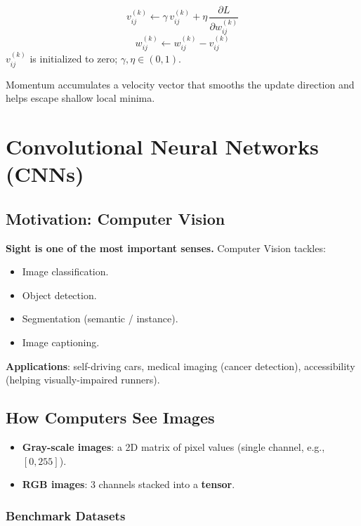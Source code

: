 \documentclass[11pt,a4paper]{article}
\begin{document}
\begin{keybox}
\[
v_{ij}^{(k)} \leftarrow \gamma\, v_{ij}^{(k)} + \eta\,\frac{\partial L}{\partial w_{ij}^{(k)}}
\]
\[
w_{ij}^{(k)} \leftarrow w_{ij}^{(k)} - v_{ij}^{(k)}
\]
$v_{ij}^{(k)}$ is initialized to zero; $\gamma, \eta \in (0,1)$.
\end{keybox}

Momentum accumulates a velocity vector that smooths the update direction and helps escape shallow local minima.

\newpage
\section{Convolutional Neural Networks (CNNs)}

\subsection{Motivation: Computer Vision}

\textbf{Sight is one of the most important senses.} Computer Vision tackles:
\begin{itemize}[leftmargin=*]
    \item Image classification.
    \item Object detection.
    \item Segmentation (semantic / instance).
    \item Image captioning.
\end{itemize}

\textbf{Applications}: self-driving cars, medical imaging (cancer detection), accessibility (helping visually-impaired runners).

\subsection{How Computers See Images}

\begin{itemize}[leftmargin=*]
    \item \textbf{Gray-scale images}: a 2D matrix of pixel values (single channel, e.g., $[0, 255]$).
    \item \textbf{RGB images}: 3 channels stacked into a \textbf{tensor}.
\end{itemize}

\subsubsection{Benchmark Datasets}
\end{document}
